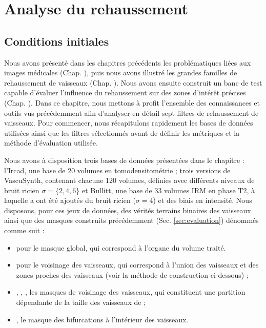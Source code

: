 \chapter{Analyse du rehaussement}
\label{sec:Analysis}
\section{Conditions initiales}
Nous avons présenté dans les chapitres précédents les problématiques liées aux images médicales (Chap. \chapContextN{}), puis nous avons illustré les grandes familles de rehaussement de vaisseaux (Chap. \chapSOTAN{}). Nous avons ensuite construit un banc de test capable d'évaluer l'influence du rehaussement sur des zones d'intérêt précises (Chap. \chapBenchN{}). Dans ce chapitre, nous mettons à profit l'ensemble des connaissances et outils vus précédemment afin d'analyser en détail sept filtres de rehaussement de vaisseaux. Pour commencer, nous récapitulons rapidement les bases de données utilisées ainsi que les filtres sélectionnés avant de définir les métriques et la méthode d'évaluation utilisée.

Nous avons à disposition trois bases de données présentées dans le chapitre \chapContextN{} : l'Ircad, une base de 20 volumes en tomodensitométrie ; trois versions de VascuSynth, contenant chacune 120 volumes, définies avec différents niveaux de bruit ricien $\sigma=\{2,4,6\}$ et Bullitt, une base de 33 volumes IRM en phase T2, à laquelle a ont été ajoutés du bruit ricien ($\sigma=4$) et des biais en intensité. Nous disposons, pour ces jeux de données, des vérités terrains binaires des vaisseaux ainsi que des masques construits précédemment (Sec. \ref{sec:evaluation}) dénommés comme suit :

\begin{itemize}
  \item \maskglobal pour le masque global, qui correspond à l'organe du volume traité.
  \item \maskvascular pour le voisinage des vaisseaux, qui correspond à l'union des vaisseaux et des zones proches des vaisseaux (voir la méthode de construction ci-dessous) ;
  \item \maskvesselLarge, \maskvesselMedium, \maskvesselSmall, les masques de voisinage des vaisseaux, qui constituent une partition dépendante de la taille des vaisseaux de \maskvascular;
  \item \maskbif, le masque des bifurcations à l'intérieur des vaisseaux.
  \end{itemize}

